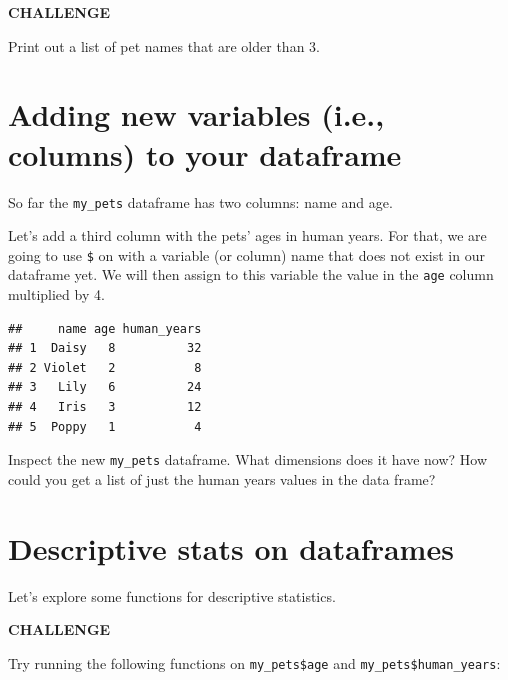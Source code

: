 \documentclass[
]{book}
\newenvironment{Shaded}{\begin{snugshade}}{\end{snugshade}}
\newcommand{\CommentTok}[1]{\textcolor[rgb]{0.56,0.35,0.01}{\textit{#1}}}
\newcommand{\DecValTok}[1]{\textcolor[rgb]{0.00,0.00,0.81}{#1}}
\newcommand{\NormalTok}[1]{#1}
\newcommand{\OperatorTok}[1]{\textcolor[rgb]{0.81,0.36,0.00}{\textbf{#1}}}
\newcommand{\StringTok}[1]{\textcolor[rgb]{0.31,0.60,0.02}{#1}}
\begin{document}
\textbf{CHALLENGE}

Print out a list of pet names that are older than 3.

\hypertarget{adding-new-variables-i.e.-columns-to-your-dataframe}{%
\section{Adding new variables (i.e., columns) to your dataframe}\label{adding-new-variables-i.e.-columns-to-your-dataframe}}

So far the \texttt{my\_pets} dataframe has two columns: name and age.

Let's add a third column with the pets' ages in human years. For that, we are going to use \texttt{\$} on with a variable (or column) name that does not exist in our dataframe yet. We will then assign to this variable the value in the \texttt{age} column multiplied by 4.

\begin{Shaded}
\end{Shaded}

\begin{verbatim}
##     name age human_years
## 1  Daisy   8          32
## 2 Violet   2           8
## 3   Lily   6          24
## 4   Iris   3          12
## 5  Poppy   1           4
\end{verbatim}

Inspect the new \texttt{my\_pets} dataframe. What dimensions does it have now? How could you get a list of just the human years values in the data frame?

\hypertarget{descriptive-stats-on-dataframes}{%
\section{Descriptive stats on dataframes}\label{descriptive-stats-on-dataframes}}

Let's explore some functions for descriptive statistics.

\textbf{CHALLENGE}

Try running the following functions on \texttt{my\_pets\$age} and \texttt{my\_pets\$human\_years}:
\end{document}

